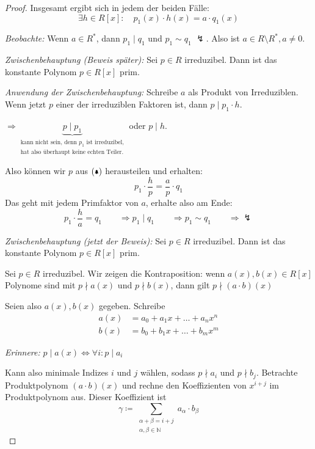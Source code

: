 \documentclass[a4paper,12pt,numbers=noenddot,parskip=full]{scrartcl}
\newcommand{\setN}{\mathbb{N}}
\theoremstyle{dotless}
\theoremstyle{remark}
\begin{document}
\begin{proof}
		Insgesamt ergibt sich in jedem der beiden Fälle:
		\begin{equation*}
			\exists h \in R[x]: \quad p_1(x) \cdot h(x) = a \cdot q_1(x) \tag{\bell}
		\end{equation*}
		
		\textit{Beobachte:} Wenn $a \in R^*$, dann $p_1 \mid q_1$ und $p_1 \sim q_1$ $\lightning$. Also ist $a \in R \setminus R^*, a \neq 0$.
		
		\textit{Zwischenbehauptung (Beweis später):} Sei $p \in R$ irreduzibel. Dann ist das konstante Polynom $p \in R[x]$ prim.
		
		\textit{Anwendung der Zwischenbehauptung:} Schreibe $a$ als Produkt von Irreduziblen. Wenn jetzt $p$ einer der irreduziblen Faktoren ist, dann $p \mid p_1 \cdot h$.
		
		$\Rightarrow \underbrace{p \mid p_1}_{\substack{\text{kann nicht sein, denn $p_1$ ist irreduzibel,}\\\text{hat also überhaupt keine echten Teiler.}}}$ oder $p \mid h$.
		
		Also können wir $p$ aus $(\bell)$ herausteilen und erhalten:
		\begin{equation*}
			p_1 \cdot \frac{h}{p} = \frac{a}{p} \cdot q_1
		\end{equation*}
		Das geht mit jedem Primfaktor von $a$, erhalte also am Ende:
		\begin{equation*}
			p_1 \cdot \frac{h}{a} = q_1 \qquad\Rightarrow p_1 \mid q_1 \qquad\Rightarrow p_1 \sim q_1 \qquad\Rightarrow \lightning
		\end{equation*}
	
		\textit{Zwischenbehauptung (jetzt der Beweis):} Sei $p \in R$ irreduzibel. Dann ist das konstante Polynom $p \in R[x]$ prim.
		
		Sei $p \in R$ irreduzibel. Wir zeigen die Kontraposition: wenn $a(x), b(x) \in R[x]$ Polynome sind mit $p \nmid a(x)$ und $p \nmid b(x)$, dann gilt $p \nmid (a \cdot b)(x)$
		
		Seien also $a(x), b(x)$ gegeben. Schreibe
		\begin{align*}
			a(x) &= a_0 + a_1 x + \dots + a_n x^n \\
			b(x) &= b_0 + b_1 x + \dots + b_m x^m
		\end{align*}
		
		\textit{Erinnere:} $p \mid a(x) \Leftrightarrow \forall i: p \mid a_i$
		
		Kann also minimale Indizes $i$ und $j$ wählen, sodass $p \nmid a_i$ und $p \nmid b_j$. Betrachte Produktpolynom $(a \cdot b)(x)$ und rechne den Koeffizienten von $x^{i+j}$ im Produktpolynom aus. Dieser Koeffizient ist
		\begin{equation*}
			\gamma \coloneqq \sum_{\substack{\alpha + \beta = i + j \\ \alpha, \beta \in \setN}} a_\alpha \cdot b_\beta
		\end{equation*}
		

\end{proof}
\end{document}
